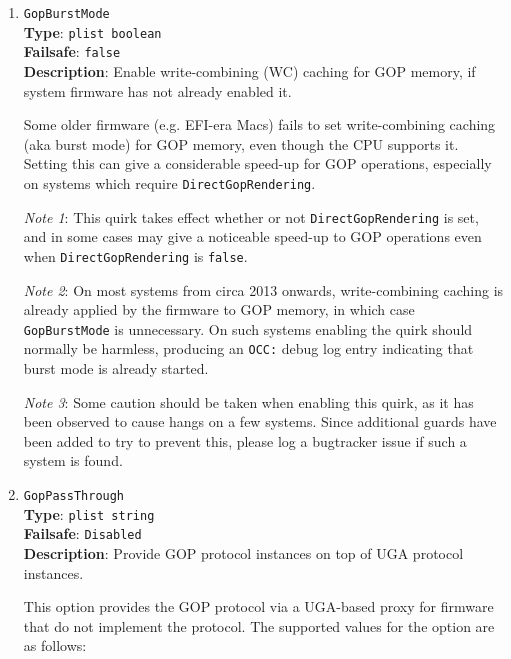 \documentclass[]{article}
\begin{document}
\begin{enumerate}
  \emph{Note}: This option depends on the \href{https://github.com/acidanthera/MaxRegnerPkg/blob/master/Include/Acidanthera/Protocol/OcForceResolution.h}{\texttt{OC\_FORCE\_RESOLUTION\_PROTOCOL}}
  protocol being present. This protocol is currently only supported by \texttt{MaxRegnerDuetPkg}. The
  \texttt{MaxRegnerDuetPkg} implementation currently only supports Intel iGPUs and certain ATI GPUs.

\item
  \texttt{GopBurstMode}\\
  \textbf{Type}: \texttt{plist\ boolean}\\
  \textbf{Failsafe}: \texttt{false}\\
  \textbf{Description}: Enable write-combining (WC) caching for GOP memory, if system firmware has not
  already enabled it.

  Some older firmware (e.g. EFI-era Macs) fails to set write-combining caching (aka burst mode)
  for GOP memory, even though the CPU supports it. Setting this can give a considerable
  speed-up for GOP operations, especially on systems which require \texttt{DirectGopRendering}.

  \emph{Note 1}: This quirk takes effect whether or not \texttt{DirectGopRendering} is set, and
  in some cases may give a noticeable speed-up to GOP operations even when \texttt{DirectGopRendering}
  is \texttt{false}.

  \emph{Note 2}: On most systems from circa 2013 onwards, write-combining
  caching is already applied by the firmware to GOP memory, in which case \texttt{GopBurstMode}
  is unnecessary. On such systems enabling the quirk should normally be harmless, producing an
  \texttt{OCC:} debug log entry indicating that burst mode is already started.

  \emph{Note 3}: Some caution should be taken when enabling this quirk, as it has been observed
  to cause hangs on a few systems. Since additional guards have been added to try to prevent this,
  please log a bugtracker issue if such a system is found.

\item
  \texttt{GopPassThrough}\\
  \textbf{Type}: \texttt{plist\ string}\\
  \textbf{Failsafe}: \texttt{Disabled}\\
  \textbf{Description}: Provide GOP protocol instances on top of UGA protocol instances.

  This option provides the GOP protocol via a UGA-based proxy
  for firmware that do not implement the protocol. The supported values
  for the option are as follows:


\end{enumerate}
\end{document}
